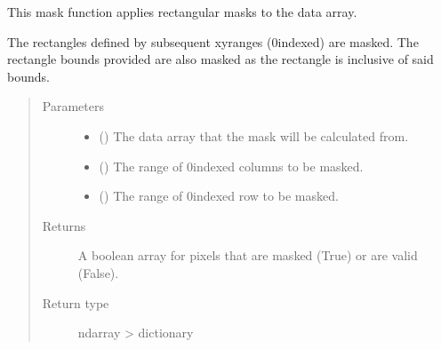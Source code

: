 \documentclass[letterpaper,10pt,english]{sphinxmanual}
\begin{document}
\begin{fulllineitems}
\label{\detokenize{docstrings/ifa_smeargle.masking.geometric:ifa_smeargle.masking.geometric.mask_rectangle}}
This mask function applies rectangular masks to the data
array.

The rectangles defined by subsequent xy\sphinxhyphen{}ranges (0\sphinxhyphen{}indexed) are
masked. The rectangle bounds provided are also masked as the
rectangle is inclusive of said bounds.
\begin{quote}\begin{description}
\item[{Parameters}] \leavevmode\begin{itemize}
\item {} 
 () \textendash{} The data array that the mask will be calculated from.

\item {} 
 () \textendash{} The range of 0\sphinxhyphen{}indexed columns to be masked.

\item {} 
 () \textendash{} The range of 0\sphinxhyphen{}indexed row to be masked.

\end{itemize}

\item[{Returns}] \leavevmode
{} \textendash{} A boolean array for pixels that are masked (True) or are
valid (False).

\item[{Return type}] \leavevmode
ndarray \sphinxhyphen{}\textgreater{} dictionary

\end{description}\end{quote}

\end{fulllineitems}
\end{document}
